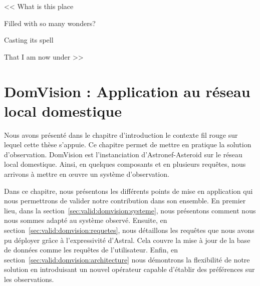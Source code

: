 \begin{savequote}[6cm]
<< What is this place

Filled with so many wonders?

Casting its spell

That I am now under >>

\end{savequote}

\chapter{DomVision : Application au réseau local domestique}
\chaptertoc
Nous avons présenté dans le chapitre d'introduction le contexte fil rouge sur lequel cette thèse s'appuie. Ce chapitre permet de mettre en pratique la solution d'observation. DomVision est l'instanciation d'Astronef-Asteroid sur le réseau local domestique. Ainsi, en quelques composants et en plusieurs requêtes, nous arrivons à mettre en œuvre un système d'observation.

Dans ce chapitre, nous présentons les différents points de mise en application qui nous permettrons de valider notre contribution dans son ensemble. En premier lieu, dans la section~\ref{sec:valid:domvision:systeme}, nous présentons comment nous nous sommes adapté au système observé. Ensuite, en section~\ref{sec:valid:domvision:requetes}, nous détaillons les requêtes que nous avons pu déployer grâce à l'expressivité d'Astral. Cela couvre la mise à jour de la base de données comme les requêtes de l'utilisateur. Enfin, en section~\ref{sec:valid:domvision:architecture} nous démontrons la flexibilité de notre solution en introduisant un nouvel opérateur capable d'établir des préférences sur les observations.





